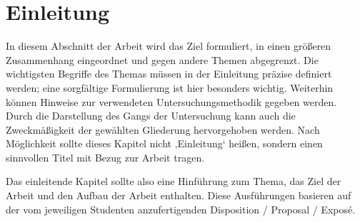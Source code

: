 \documentclass[11pt]{scrartcl}
\begin{document}
\listoftables
\newpage

\onehalfspacing

\setcounter{page}{1}

\clearpairofpagestyles

\lohead{\rightmark}


\rehead{\pagemark}
\rohead{\pagemark}

%
% 

\section{Einleitung}
In diesem Abschnitt der Arbeit wird das Ziel formuliert, in einen größeren Zusammenhang eingeordnet und gegen andere Themen abgegrenzt. Die wichtigsten Begriffe des Themas müssen in der Einleitung präzise definiert werden; eine sorgfältige Formulierung ist hier besonders wichtig. Weiterhin können Hinweise zur verwendeten Untersuchungsmethodik gegeben werden. Durch die Darstellung des Gangs der Untersuchung kann auch die Zweckmäßigkeit der gewählten Gliederung hervorgehoben werden.  Nach Möglichkeit sollte dieses Kapitel nicht ‚Einleitung‘ heißen, sondern einen sinnvollen Titel mit Bezug zur Arbeit tragen.

Das einleitende Kapitel sollte also eine Hinführung zum Thema, das Ziel der Arbeit und den Aufbau der Arbeit enthalten. Diese Ausführungen basieren auf der vom jeweiligen Studenten anzufertigenden Disposition / Proposal / Exposé.
\end{document}
